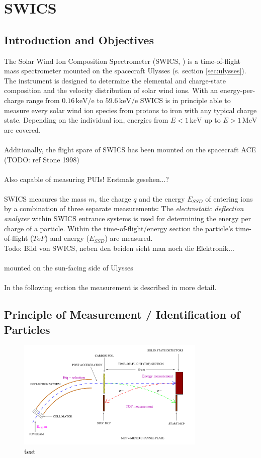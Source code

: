 \section{SWICS}

\subsection{Introduction and Objectives}
The Solar Wind Ion Composition Spectrometer (SWICS, \citet{gloeckler_1992}) is a time-of-flight mass spectrometer mounted on the spacecraft Ulysses (s. section \ref{sec:ulysses}). The instrument is designed to determine the elemental and charge-state composition and the velocity distribution of solar wind ions. With an energy-per-charge range from $0.16 \, \mathrm{keV/e}$ to $59.6 \, \mathrm{keV / e}$ SWICS is in principle able to measure every solar wind ion species from protons to iron with any typical charge state. Depending on the individual ion, energies from $E < 1 \,\mathrm{keV}$ up to $E > 1 \, \mathrm{MeV}$ are covered.
\\ \\
Additionally, the flight spare of SWICS has been mounted on the spacecraft ACE (TODO: ref Stone 1998)
\\ \\ 
Also capable of measuring PUIs! Erstmals gesehen...?
\\ \\
SWICS measures the mass $m$, the charge $q$ and the energy $E_{SSD}$ of entering ions by a combination of three separate measurements: The \textit{electrostatic deflection analyzer} within SWICS entrance systems is used for determining the energy per charge of a particle. Within the time-of-flight/energy section the particle's time-of-flight ($ToF$) and energy ($E_{SSD}$) are measured. \\ 
Todo: Bild von SWICS, neben den beiden sieht man noch die Elektronik...
\\ \\
mounted on the sun-facing side of Ulysses
\\ \\
In the following section the measurement is described in more detail.
\subsection{Principle of Measurement / Identification of Particles}
\begin{figure}[h]
	\includegraphics[width=0.8\textwidth]{Figures/Lars_Swics.png}
	\centering
	\caption{test}
	\label{fig:lars_swics}
\end{figure}


